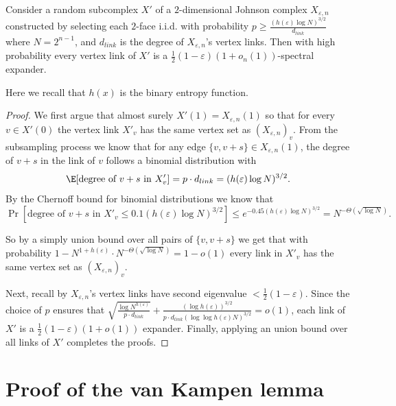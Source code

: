 \begin{corollary}
    Consider a random subcomplex $X'$ of a $2$-dimensional Johnson complex $X_{\varepsilon, n}$ constructed by selecting each $2$-face i.i.d. with probability $p \ge \frac{(h(\varepsilon)\log N)^{3/2}}{d_{link}}$ where $N =  2^{n-1}$, and $d_{link}$ is the degree of $X_{\varepsilon, n}$'s vertex links. Then with high probability every vertex link of $X'$ is a $\frac{1}{2}(1-\varepsilon)(1+o_n(1))$-spectral expander.
\end{corollary}
Here we recall that \(h(x)\) is the binary entropy function.
\begin{proof}
    We first argue that almost surely $X'(1) = X_{\varepsilon,n}(1)$ so that for every $v\in X'(0)$ the vertex link $X'_v$ has the same vertex set as $(X_{\varepsilon,n})_v$. From the subsampling process we know that for any edge $\{v,v+s\} \in X_{\varepsilon,n}(1)$, the degree of $v+s$ in the link of $v$ follows a binomial distribution with
    \[\E[\textrm{degree of } v+s \textrm{ in } X'_v] 
        = p \cdot d_{link} =(h(\varepsilon)\log N)^{3/2}.\]
    By the Chernoff bound for binomial distributions we know that 
    \[\Pr[\textrm{degree of } v+s \textrm{ in } X'_v \le 0.1 (h(\varepsilon)\log N)^{3/2} ] \le e^{-0.45(h(\varepsilon)\log N)^{3/2}} = N^{-\Theta(\sqrt{\log N})}.\]

    So by a simply union bound over all pairs of $\{v,v+s\}$ we get that with probability $1 - N^{1+h(\varepsilon)} \cdot N^{-\Theta(\sqrt{\log N})} = 1- o(1)$ every link in $X'_v$ has the same vertex set as $(X_{\varepsilon,n})_v$.

    Next, recall by  $X_{\varepsilon,n}$'s vertex links have second eigenvalue $<\frac{1}{2}(1-\varepsilon)$. Since the choice of $p$ ensures that $\sqrt{\frac{\log N^{h(\varepsilon)}}{p\cdot d_{link}}} + \frac{(\log h(\varepsilon))^{3/2}}{p\cdot d_{link} (\log\log h(\varepsilon)N)^{3/2}} = o(1)$, each link of $X'$ is a $\frac{1}{2}(1-\varepsilon)(1+o(1))$ expander. Finally, applying an union bound over all links of $X'$ completes the proofs.
\end{proof}



\section{Proof of the van Kampen lemma}
\label{app:van-kampen}


